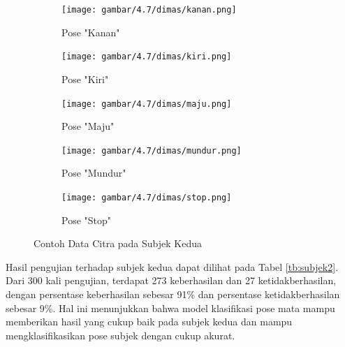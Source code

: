 \begin{figure}[H]
  \centering
  \begin{subfigure}[b]{0.329\linewidth}
      \texttt{[image: gambar/4.7/dimas/kanan.png]}
      \caption{Pose "Kanan"}
      \label{fig:dimas1}
  \end{subfigure}
  \hfill %
  \begin{subfigure}[b]{0.329\linewidth}
    \texttt{[image: gambar/4.7/dimas/kiri.png]}
    \caption{Pose "Kiri"}
    \label{fig:dimas2}
  \end{subfigure}
  \vspace{1cm} %
  \begin{subfigure}[b]{0.329\linewidth}
    \texttt{[image: gambar/4.7/dimas/maju.png]}
    \caption{Pose "Maju"}
    \label{fig:dimas3}
  \end{subfigure}
  \begin{subfigure}[b]{0.32\linewidth}
    \texttt{[image: gambar/4.7/dimas/mundur.png]}
    \caption{Pose "Mundur"}
    \label{fig:dimas4}
  \end{subfigure}
  \begin{subfigure}[b]{0.32\linewidth}
    \texttt{[image: gambar/4.7/dimas/stop.png]}
    \caption{Pose "Stop"}
    \label{fig:dimas5}
  \end{subfigure}
  \caption{Contoh Data Citra pada Subjek Kedua}
  \label{fig:subjek2}
\end{figure}

Hasil pengujian terhadap subjek kedua dapat dilihat pada Tabel \ref{tb:subjek2}. Dari 300 kali pengujian, terdapat 273 keberhasilan dan 27 ketidakberhasilan, dengan persentase keberhasilan sebesar 91\% dan persentase ketidakberhasilan sebesar 9\%. Hal ini menunjukkan bahwa model klasifikasi pose mata mampu memberikan hasil yang cukup baik pada subjek kedua dan mampu mengklasifikasikan pose subjek dengan cukup akurat.

